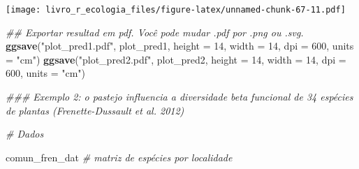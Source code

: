 \documentclass[
]{book}
\newenvironment{Shaded}{\begin{snugshade}}{\end{snugshade}}
\newcommand{\CommentTok}[1]{\textcolor[rgb]{0.56,0.35,0.01}{\textit{#1}}}
\newcommand{\DataTypeTok}[1]{\textcolor[rgb]{0.13,0.29,0.53}{#1}}
\newcommand{\DecValTok}[1]{\textcolor[rgb]{0.00,0.00,0.81}{#1}}
\newcommand{\KeywordTok}[1]{\textcolor[rgb]{0.13,0.29,0.53}{\textbf{#1}}}
\newcommand{\NormalTok}[1]{#1}
\newcommand{\StringTok}[1]{\textcolor[rgb]{0.31,0.60,0.02}{#1}}
\begin{document}
\texttt{[image: livro\_r\_ecologia\_files/figure-latex/unnamed-chunk-67-11.pdf]}

\begin{Shaded}
\begin{Highlighting}[]
\CommentTok{## Exportar resultad em pdf. Você pode mudar .pdf por .png ou .svg.}
\KeywordTok{ggsave}\NormalTok{(}\StringTok{"plot_pred1.pdf"}\NormalTok{, plot_pred1, }\DataTypeTok{height =} \DecValTok{14}\NormalTok{, }\DataTypeTok{width =} \DecValTok{14}\NormalTok{, }\DataTypeTok{dpi =} \DecValTok{600}\NormalTok{, }\DataTypeTok{units =} \StringTok{"cm"}\NormalTok{)}
\KeywordTok{ggsave}\NormalTok{(}\StringTok{"plot_pred2.pdf"}\NormalTok{, plot_pred2, }\DataTypeTok{height =} \DecValTok{14}\NormalTok{, }\DataTypeTok{width =} \DecValTok{14}\NormalTok{, }\DataTypeTok{dpi =} \DecValTok{600}\NormalTok{, }\DataTypeTok{units =} \StringTok{"cm"}\NormalTok{)}
\end{Highlighting}
\end{Shaded}

\begin{Shaded}
\begin{Highlighting}[]
\CommentTok{### Exemplo 2: o pastejo influencia a diversidade beta funcional de 34 espécies de plantas (Frenette-Dussault et al. 2012)}


\CommentTok{# Dados}

\NormalTok{comun_fren_dat }\CommentTok{# matriz de espécies por localidade}
\end{Highlighting}
\end{Shaded}
\end{document}
